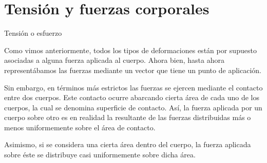 \documentclass[11pt,handout,aspectratio=1610]{beamer}
\newcommand{\vs}{\vspace{11pt}}
\begin{document}
\section{Tensión y fuerzas corporales}

\begin{frame}{Tensión o esfuerzo}

    Como vimos anteriormente, todos los tipos de deformaciones están por supuesto asociadas a alguna fuerza aplicada al cuerpo. Ahora bien, hasta ahora representábamos las fuerzas mediante un vector que tiene un punto de aplicación.

    \vs

    Sin embargo, en términos más estrictos las fuerzas se ejercen mediante el contacto entre dos cuerpos. Este contacto ocurre abarcando cierta área de cada uno de los cuerpos, la cual se denomina superficie de contacto. Así, la fuerza aplicada por un cuerpo sobre otro es en realidad la resultante de las fuerzas distribuidas más o menos uniformemente sobre el área de contacto.

    \vs 

    Asimismo, si se considera una cierta área dentro del cuerpo, la fuerza aplicada sobre éste se distribuye casi uniformemente sobre dicha área.

\end{frame}
\end{document}
